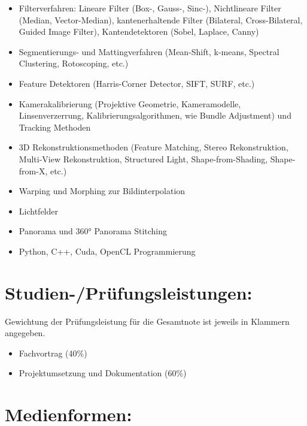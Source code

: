 \begin{itemize}
\tightlist
\item
  Filterverfahren: Lineare Filter (Box-, Gauss-, Sinc-), Nichtlineare
  Filter (Median, Vector-Median), kantenerhaltende Filter (Bilateral,
  Cross-Bilateral, Guided Image Filter), Kantendetektoren (Sobel,
  Laplace, Canny)
\item
  Segmentierungs- und Mattingverfahren (Mean-Shift, k-means, Spectral
  Clustering, Rotoscoping, etc.)
\item
  Feature Detektoren (Harris-Corner Detector, SIFT, SURF, etc.)
\item
  Kamerakalibrierung (Projektive Geometrie, Kameramodelle,
  Linsenverzerrung, Kalibrierungsalgorithmen, wie Bundle Adjustment) und
  Tracking Methoden
\item
  3D Rekonstruktionsmethoden (Feature Matching, Stereo Rekonstruktion,
  Multi-View Rekonstruktion, Structured Light, Shape-from-Shading,
  Shape-from-X, etc.)
\item
  Warping und Morphing zur Bildinterpolation
\item
  Lichtfelder
\item
  Panorama und 360° Panorama Stitching
\item
  Python, C++, Cuda, OpenCL Programmierung
\end{itemize}

\section*{Studien-/Prüfungsleistungen:\label{/mi-2017/modulbeschreibungen-master/MA_VC_Modul_BildbasierteComputergrafik}}\label{studien-pruxfcfungsleistungenpathlabelmi-2017modulbeschreibungen-mastermaux5fvcux5fmodulux5fbildbasiertecomputergrafik}

Gewichtung der Prüfungsleistung für die Gesamtnote ist jeweils in
Klammern angegeben.

\begin{itemize}
\tightlist
\item
  Fachvortrag (40\%)
\item
  Projektumsetzung und Dokumentation (60\%)
\end{itemize}

\section*{Medienformen:\label{/mi-2017/modulbeschreibungen-master/MA_VC_Modul_BildbasierteComputergrafik}}\label{medienformenpathlabelmi-2017modulbeschreibungen-mastermaux5fvcux5fmodulux5fbildbasiertecomputergrafik}

